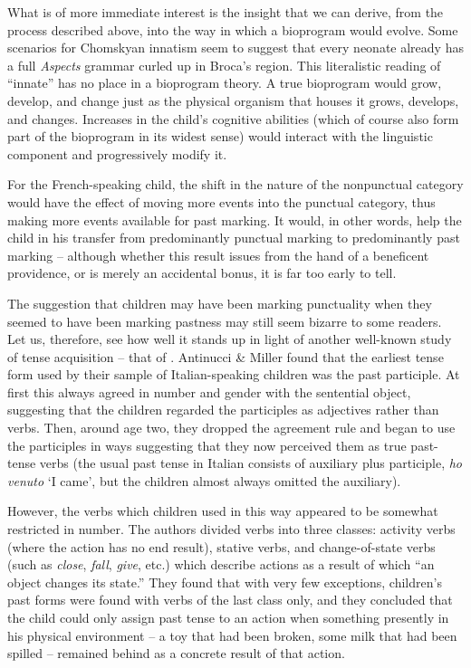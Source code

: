 What is of more immediate interest is the insight that we can derive, from the process described above, into the way in which a bioprogram would evolve. Some scenarios for Chomskyan innatism seem to suggest that every neonate already has a full \textit{Aspects} grammar curled
up in Broca's region. This literalistic reading of ``innate'' has no place in a bioprogram theory. A true bioprogram would grow, develop, and change just as the physical organism that houses it grows, develops, and changes. Increases in the child's cognitive abilities (which of course also form part of the bioprogram in its widest sense) would interact with the linguistic component and progressively modify it.

For the French-speaking child, the shift in the nature of the nonpunctual category would have the effect of moving more events into the punctual category, thus making more events available for past marking. It would, in other words, help the child in his transfer from predominantly punctual marking to predominantly past marking -- although whether this result issues from the hand of a beneficent providence, or is merely an accidental bonus, it is far too early to tell.

The suggestion that children may have been marking punctuality when they seemed to have been marking pastness may still seem bizarre to some readers. Let us, therefore, see how well it stands up in light of another well-known study of tense acquisition -- that of \citet{AntinucciEtAl1976}.
Antinucci \& Miller found that the earliest tense form used by their sample of Italian-speaking children was the past participle. At first this always agreed in number and gender with the sentential object, suggesting that the children regarded the participles as adjectives rather than verbs. Then, around age two, they dropped the agreement rule and began to use the participles in ways suggesting that they now perceived them as true past-tense verbs (the usual past tense in Italian consists of auxiliary plus participle, \textit{ho venuto} `I came', but the children almost always omitted the auxiliary).

However, the verbs which children used in this way appeared to be somewhat restricted in number. The authors divided verbs into three classes: activity verbs (where the action has no end result), stative verbs, and change-of-state verbs (such as \textit{close}, \textit{fall}, \textit{give}, etc.) which describe actions as a result of which ``an object changes its state.'' They found that with very few exceptions, children's past
forms were found with verbs of the last class only, and they concluded that the child could only assign past tense to an action when some\-thing presently in his physical environment -- a toy that had been broken, some milk that had been spilled -- remained behind as a concrete result of that action.

